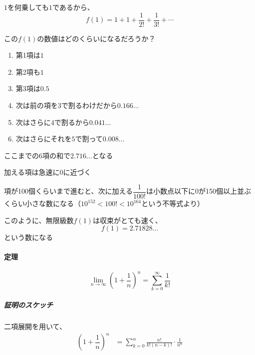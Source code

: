\documentclass[../book_jiriki_calc]{subfiles}
\begin{document}
$1$を何乗しても$1$であるから、
\begin{equation}
  f(1) = 1 + 1 + \dfrac{1}{2!} + \dfrac{1}{3!} + \cdots
\end{equation}

\br

この$f(1)$の数値はどのくらいになるだろうか？
\begin{enumerate}
  \item 第1項は$1$
  \item 第2項も$1$
  \item 第3項は$0.5$
  \item 次は前の項を$3$で割るわけだから$0.166\ldots$
  \item 次はさらに$4$で割るから$0.041\ldots$
  \item 次はさらにそれを$5$で割って$0.008\ldots$
\end{enumerate}
ここまでの$6$項の和で$2.716\ldots$となる

\br

加える項は急速に$0$に近づく

項が100個くらいまで進むと、次に加える$\dfrac{1}{100!}$は小数点以下に$0$が150個以上並ぶくらい小さな数になる（$10^{152}<100!<10^{164}$という不等式より）

\br

このように、無限級数$f(1)$は収束がとても速く、
\begin{equation}
  f(1) = 2.71828\ldots
\end{equation}
という数になる

\sectionline

\paragraph{定理}

\begin{equation}
  \lim_{n\to\infty}\left(1+\dfrac{1}{n}\right)^n = \sum_{k=0}^{\infty} \dfrac{1}{k!}
\end{equation}

\br

\subparagraph{証明のスケッチ}

二項展開を用いて、
\begin{align}
  \left(1+\dfrac{1}{n}\right)^n
   & = \sum_{k=0}^{n} \frac{n!}{k!(n-k)!} \cdot \frac{1}{n^k}
\end{align}
\end{document}
